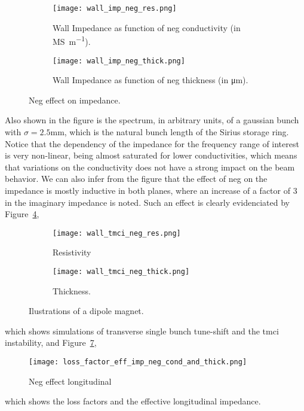     \begin{figure}
        \def \mysize {0.9\textwidth}
        \centering
        \begin{subfigure}[c]{\textwidth}
            \centering
            \caption{Wall Impedance as function of \gls{neg} conductivity (in \si{\mega\siemens\per\meter}).}
            \label{fig:wall_impedance_neg_res}
            \texttt{[image: wall\_imp\_neg\_res.png]}
        \end{subfigure}
        \begin{subfigure}[c]{\textwidth}
            \centering
            \caption{Wall Impedance as function of \gls{neg} thickness (in \si{\micro\meter}).}
            \label{fig:wall_impedance_neg_thick}
            \texttt{[image: wall\_imp\_neg\_thick.png]}
        \end{subfigure}
        \caption{Neg effect on impedance.}
        \label{fig:wall_impedance_neg}
    \end{figure}
    Also shown in the figure is the spectrum, in arbitrary units, of a gaussian bunch with $\sigma=2.5$\si{\milli\meter}, which is the natural bunch length of the Sirius storage ring. Notice that the dependency of the impedance for the frequency range of interest is very non-linear, being almost saturated for lower conductivities, which means that variations on the conductivity does not have a strong impact on the beam behavior. We can also infer from the figure that the effect of \gls{neg} on the impedance is mostly inductive in both planes, where an increase of a factor of \SI{3}{} in the imaginary impedance is noted. Such an effect is clearly evidenciated by Figure~\ref{fig:wall_tmci_neg_res},
    \begin{figure}[t!]
        \centering
        \begin{subfigure}[c]{0.49\textwidth}
            \texttt{[image: wall\_tmci\_neg\_res.png]}
            \caption{Resistivity}
            \label{fig:wall_tmci_neg_res}
            \end{subfigure}\hfill
            \begin{subfigure}[c]{0.49\textwidth}
                \texttt{[image: wall\_tmci\_neg\_thick.png]}
                \caption{Thickness.}
                \label{fig:wall_tmci_neg_thick}
            \end{subfigure}
            \caption{Ilustrations of a dipole magnet.}
            \label{fig:wall_tmci_neg}
        \end{figure}
    which shows simulations of transverse single bunch tune-shift and the \gls{tmci} instability, and Figure~\ref{fig:wall_loss_facttor_eff_imp_cond_thick},
    \begin{figure}
        \centering
        \texttt{[image: loss\_factor\_eff\_imp\_neg\_cond\_and\_thick.png]}
        \caption{Neg effect longitudinal}
        \label{fig:wall_loss_facttor_eff_imp_cond_thick}
    \end{figure}
    which shows the loss factors and the effective longitudinal impedance.

